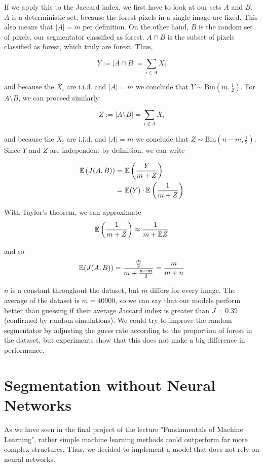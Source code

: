If we apply this to the Jaccard index, we first have to look at our sets $A$ and $B$. $A$ is a deterministic set, because the forest pixels in a single image are fixed. This also means that $|A|=m$ per definition. On the other hand, $B$ is the random set of pixels, our segmentator classified as forest. $A \cap B$ is the subset of pixels classified as forest, which truly are forest. Thus,

\begin{equation}
  Y:= |A \cap B| = \sum_{i \in A} X_i
\end{equation}

and because the $X_i$ are i.i.d. and $|A|=m$ we conclude that $Y\sim \text{Bin}(m, \frac{1}{2})$. For $A\setminus B$, we can proceed similarly:

\begin{equation}
  Z:= |A\setminus B| = \sum_{i \notin A} X_i
\end{equation}

and because the $X_i$ are i.i.d. and $|A|=m$ we conclude that $Z\sim \text{Bin}\left (n-m, \frac{1}{2} \right)$. Since $Y$ and $Z$ are independent by definition, we can write

\begin{align*}
  \mathbb{E}\left(J(A,B)\right) = \ & \mathbb{E} \left(\frac{Y}{m+Z} \right) \\
   = \ & \mathbb{E}(Y) \cdot \mathbb{E} \left(\frac{1}{m+Z} \right)
\end{align*}

With Taylor's theorem, we can approximate
\begin{equation}
  \mathbb{E} \left(\frac{1}{m+Z}\right) \approx \frac{1}{m+\mathbb{E} Z}
\end{equation}

and so
\begin{equation}
  \mathbb{E}(J(A,B)) = \frac{\frac{m}{2}}{m + \frac{n-m}{2}} = \frac{m}{m+n}
\end{equation}

$n$ is a constant throughout the dataset, but $m$ differs for every image. The average of the dataset is $m=40900$, so we can say that our models perform better than guessing if their average Jaccard index is greater than $J = 0.39$ (confirmed by random simulations). We could try to improve the random segmentator by adjusting the guess rate according to the proportion of forest in the dataset, but experiments show that this does not make a big difference in performance.\\

\section{Segmentation without Neural Networks}
As we have seen in the final project of the lecture "Fundamentals of Machine Learning", rather simple machine learning methods could outperform far more complex structures. Thus, we decided to implement a model that does not rely on neural networks.

